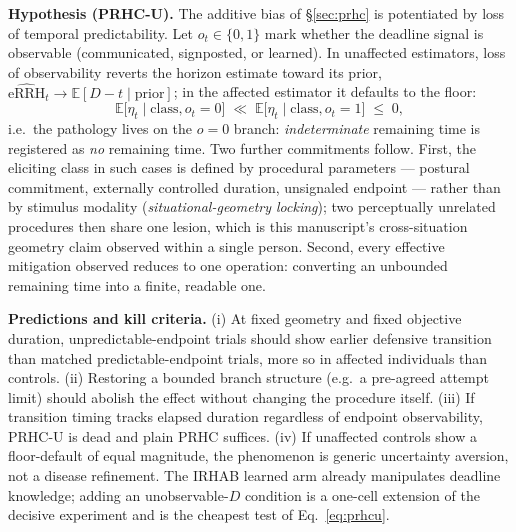 \documentclass[9pt,twocolumn]{article}
\newcommand{\eRRHhat}{\widehat{\mathrm{eRRH}}}
\begin{document}
\textbf{Hypothesis (PRHC-U).} The additive bias of \S\ref{sec:prhc} is potentiated by loss of temporal predictability. Let $o_t\in\{0,1\}$ mark whether the deadline signal is observable (communicated, signposted, or learned). In unaffected estimators, loss of observability reverts the horizon estimate toward its prior, $\eRRHhat_t\to\mathbb E[D-t\mid \text{prior}]$; in the affected estimator it defaults to the floor:
\begin{equation}
\mathbb E\big[\eta_t \mid \text{class}, o_t=0\big]\;\ll\;\mathbb E\big[\eta_t \mid \text{class}, o_t=1\big]\;\le\;0,
\label{eq:prhcu}
\end{equation}
i.e.\ the pathology lives on the $o=0$ branch: \emph{indeterminate} remaining time is registered as \emph{no} remaining time. Two further commitments follow. First, the eliciting class in such cases is defined by procedural parameters --- postural commitment, externally controlled duration, unsignaled endpoint --- rather than by stimulus modality (\emph{situational-geometry locking}); two perceptually unrelated procedures then share one lesion, which is this manuscript's cross-situation geometry claim observed within a single person. Second, every effective mitigation observed reduces to one operation: converting an unbounded remaining time into a finite, readable one.

\textbf{Predictions and kill criteria.} (i) At fixed geometry and fixed objective duration, unpredictable-endpoint trials should show earlier defensive transition than matched predictable-endpoint trials, more so in affected individuals than controls. (ii) Restoring a bounded branch structure (e.g.\ a pre-agreed attempt limit) should abolish the effect without changing the procedure itself. (iii) If transition timing tracks elapsed duration regardless of endpoint observability, PRHC-U is dead and plain PRHC suffices. (iv) If unaffected controls show a floor-default of equal magnitude, the phenomenon is generic uncertainty aversion, not a disease refinement. The IRHAB learned arm already manipulates deadline knowledge; adding an unobservable-$D$ condition is a one-cell extension of the decisive experiment and is the cheapest test of Eq.~\ref{eq:prhcu}.
\end{document}
